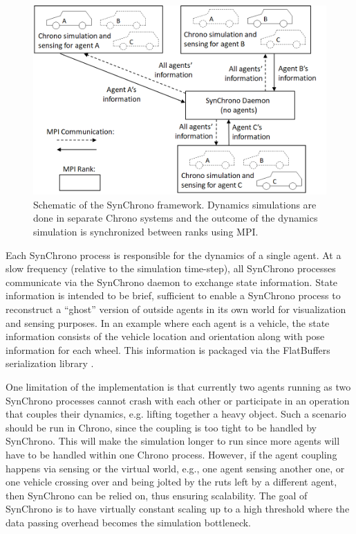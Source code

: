 \documentclass[12pt,twocolumn]{article}
\begin{document}
\begin{figure}
	\centering
	\includegraphics[width=\columnwidth]{Figs/syn_cars_diagram.png}
	\caption{{\small Schematic of the SynChrono framework. Dynamics simulations are done in separate Chrono systems and the outcome of the dynamics simulation is synchronized between ranks using MPI.}}   
	\label{fig:mpischematic}
\end{figure}

Each SynChrono process is responsible for the dynamics of a single agent. At a slow frequency (relative to the simulation time-step), all SynChrono processes communicate via the SynChrono daemon to exchange state information. State information is intended to be brief, sufficient to enable a SynChrono process to reconstruct a ``ghost'' version of outside agents in its own world for visualization and sensing purposes. In an example where each agent is a vehicle, the state information consists of the vehicle location and orientation along with pose information for each wheel. This information is packaged via the FlatBuffers serialization library \cite{flatbuffers}. 

One limitation of the implementation is that currently two agents running as two SynChrono processes cannot crash with each other or participate in an operation that couples their dynamics, e.g. lifting together a heavy object. Such a scenario should be run in Chrono, since the coupling is too tight to be handled by SynChrono. This will make the simulation longer to run since more agents will have to be handled within one Chrono process. However, if the agent coupling happens via sensing or the virtual world, e.g., one agent sensing another one, or one vehicle crossing over and being jolted by the ruts left by a different agent, then SynChrono can be relied on, thus ensuring scalability. The goal of SynChrono is to have virtually constant scaling up to a high threshold where the data passing overhead becomes the simulation bottleneck. 
\end{document}
